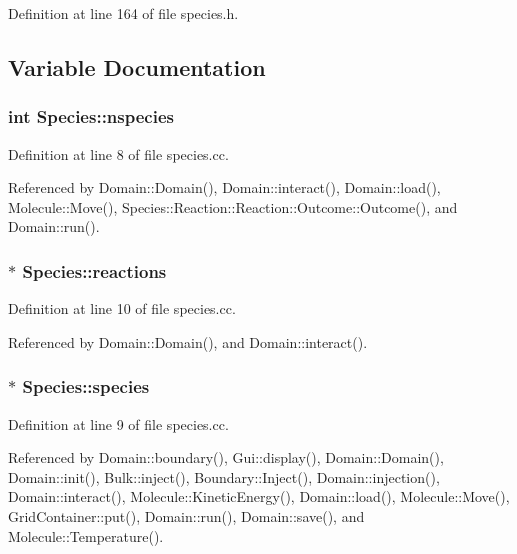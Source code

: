 Definition at line 164 of file species.h.

\subsection{Variable Documentation}
\hypertarget{namespaceSpecies_ae2c14c915d4e318d3f91c7c923703c2}{
\subsubsection[{nspecies}]{\setlength{\rightskip}{0pt plus 5cm}int {\bf Species::nspecies}}}
\label{namespaceSpecies_ae2c14c915d4e318d3f91c7c923703c2}




Definition at line 8 of file species.cc.

Referenced by Domain::Domain(), Domain::interact(), Domain::load(), Molecule::Move(), Species::Reaction::Reaction::Outcome::Outcome(), and Domain::run().\hypertarget{namespaceSpecies_e880334166f7d3eb95e744b0d895d483}{
\subsubsection[{reactions}]{ $\ast$ {\bf Species::reactions}}}
\label{namespaceSpecies_e880334166f7d3eb95e744b0d895d483}




Definition at line 10 of file species.cc.

Referenced by Domain::Domain(), and Domain::interact().\hypertarget{namespaceSpecies_fd6fa7c938aa29a1b23b04e0aaed469f}{
\subsubsection[{species}]{ $\ast$ {\bf Species::species}}}
\label{namespaceSpecies_fd6fa7c938aa29a1b23b04e0aaed469f}




Definition at line 9 of file species.cc.

Referenced by Domain::boundary(), Gui::display(), Domain::Domain(), Domain::init(), Bulk::inject(), Boundary::Inject(), Domain::injection(), Domain::interact(), Molecule::KineticEnergy(), Domain::load(), Molecule::Move(), GridContainer::put(), Domain::run(), Domain::save(), and Molecule::Temperature().